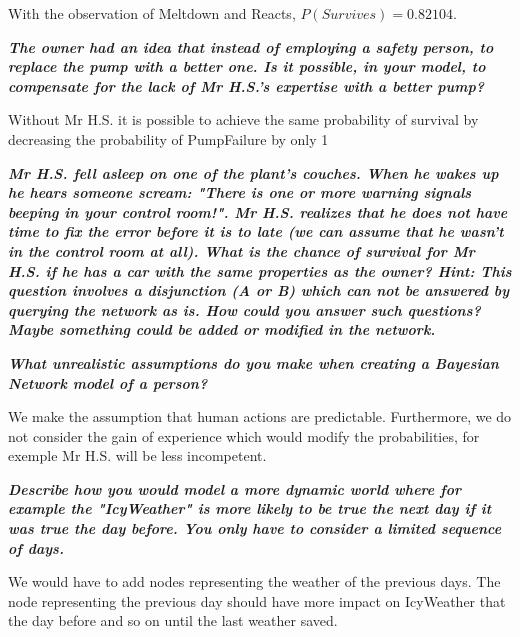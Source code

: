 With the observation of Meltdown and Reacts, $P(Survives)=0.82104$.

\textit{\textbf{The owner had an idea that instead of employing a safety person,
to replace the pump with a better one. Is it possible, in your model, to
compensate for the lack of Mr H.S.'s expertise with a better pump?}}

Without Mr H.S. it is possible to achieve the same probability of survival by
decreasing the probability of PumpFailure by only 1%

\textit{\textbf{Mr H.S. fell asleep on one of the plant's couches.
 When he wakes up he hears someone scream: "There is one or more warning
 signals beeping in your control room!". Mr H.S. realizes that he does not
 have time to fix the error before it is to late (we can assume that he wasn't
  in the control room at all). What is the chance of survival for Mr H.S. if he
   has a car with the same properties as the owner? Hint: This question involves
    a disjunction (A or B) which can not be answered by querying the network
    as is. How could you answer such questions? Maybe something could be added
    or modified in the network.}}

\textit{\textbf{What unrealistic assumptions do you make when creating a
Bayesian Network model of a person?}}

We make the assumption that human actions are predictable. Furthermore, we do not
consider the gain of experience which would modify the probabilities, for exemple
Mr H.S. will be less incompetent.

\textit{\textbf{Describe how you would model a more dynamic world where for
 example the "IcyWeather" is more likely to be true the next day if it was
 true the day before. You only have to consider a limited sequence of days.}}

We would have to add nodes representing the weather of the previous days.
The node representing the previous day should have more impact on IcyWeather that
the day before and so on until the last weather saved.


\newpage
\thispagestyle{empty}
